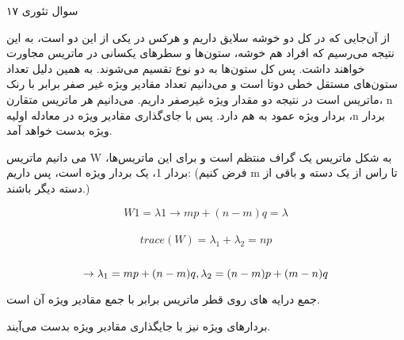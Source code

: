 سوال تئوری ۱۷

از آن‌جایی که در کل دو خوشه سلایق داریم و هرکس در یکی از این دو است، به این نتیجه می‌رسیم که افراد هم خوشه، ستون‌ها و سطرهای یکسانی در ماتریس مجاورت  خواهند داشت. پس کل ستون‌ها به دو نوع تقسیم می‌شوند. به همین دلیل تعداد ستون‌های مستقل خطی دوتا است و می‌دانیم تعداد مقادیر ویژه غیر صفر برابر با رنک ماتریس است در نتیجه دو مقدار ویژه غیرصفر داریم.
می‌دانیم هر ماتریس متقارن، n بردار ویژه عمود به هم دارد. پس با جای‌گذاری مقادیر ویژه در معادله اولیه ،n بردار ویژه بدست خواهد آمد.

می دانیم ماتریس W به شکل ماتریس یک گراف منتظم است و برای این ماتریس‌ها، بردار 1، یک بردار ویژه است، پس داریم:
(فرض کنیم m تا راس از یک دسته و باقی از دسته دیگر باشند.)

$$W 1 = \lambda 1 \rightarrow mp + (n-m)q = \lambda $$
\\
$$ trace(W) = \lambda_{1} + \lambda_{2} = np $$
\\
$$ \rightarrow \lambda_{1} = mp + (n-m)q, \space \lambda_{2} = (n-m)p + (m-n)q $$

جمع درایه های روی قطر ماتریس برابر با جمع مقادیر ویژه آن است.

بردارهای ویژه نیز با جایگذاری مقادیر ویژه بدست می‌آیند.
